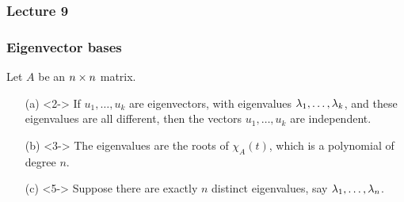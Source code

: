 \documentclass[9pt]{beamer}
\begin{document}
\begin{frame}\frametitle{Lecture 9}\end{frame}

\begin{frame}[t]
 \frametitle{Eigenvector bases}
 
 Let $A$ be an $n\times n$ matrix. 
 \begin{itemize}
  \item[(a)]<2-> If $u_1,\dotsc,u_k$ are eigenvectors, with eigenvalues
   $\lambda_1,\dots,\lambda_k$, and these eigenvalues are all different, then
   the vectors $u_1,\dotsc,u_k$ are independent.
  \item[(b)]<3-> The eigenvalues are the roots of $\chi_A(t)$, which is a
   polynomial of degree $n$.  
  \item[(c)]<5-> Suppose there are exactly $n$ distinct eigenvalues, say
   $\lambda_1,\dotsc,\lambda_n$.  
 \end{itemize}
\end{frame}
\end{document}
